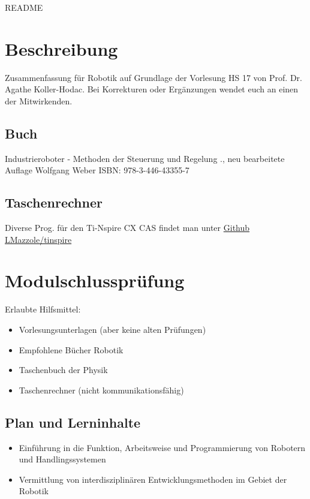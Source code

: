 \thispagestyle{empty}
\setcounter{page}{0} %
{\huge README }
\section*{Beschreibung}
Zusammenfassung für Robotik auf Grundlage der Vorlesung HS 17 von Prof. Dr. Agathe Koller-Hodac. \newline
Bei Korrekturen oder Ergänzungen wendet euch an einen der Mitwirkenden.

\subsection*{Buch}
Industrieroboter - Methoden der Steuerung und Regelung ., neu bearbeitete Auflage\newline
Wolfgang Weber\newline
ISBN: 978-3-446-43355-7

\subsection*{Taschenrechner}
Diverse Prog. für den Ti-Nspire CX CAS findet man unter \href{https://github.com/LMazzole/tinspire}{Github LMazzole/tinspire}
\section*{Modulschlussprüfung}
Erlaubte Hilfsmittel:
\begin{itemize}
    \item Vorlesungsunterlagen (aber keine alten Prüfungen)
    \item Empfohlene Bücher Robotik
    \item Taschenbuch der Physik
    \item Taschenrechner (nicht kommunikationsfähig)
\end{itemize}


\subsection*{Plan und Lerninhalte}
    \begin{itemize}
        \item Einführung in die Funktion, Arbeitsweise und Programmierung von Robotern und Handlingssystemen
        \item Vermittlung von interdisziplinären Entwicklungsmethoden im Gebiet der Robotik
    \end{itemize}
\vfill
